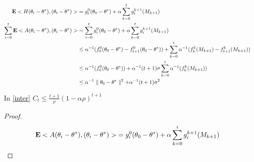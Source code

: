 \begin{align*}
\mathbf{E}<H(\theta_t-\theta^*),(\theta_t-\theta^*)>&=g^0_t(\theta_0-\theta^*)+\alpha\sum_{k=0}^t g^{k+1}_t(M_{k+1})\\
\sum_{i=0}^t\mathbf{E}<A(\theta_i-\theta^*),(\theta_i-\theta^*)>&=\sum_{i=0}^t g^0_i(\theta_0-\theta^*)+\alpha\sum_{k=0}^t g^{k+1}_i(M_{k+1})\\
&\leq\alpha^{-1}(f^0_0(\theta_0-\theta^*)-f^0_{t+1}(\theta_0-\theta^*))+\sum_{k=0}^t \alpha^{-1}(f^k_k(M_{k+1})-f^k_{t+1}(M_{k+1}))\\
&\leq\alpha^{-1}(f^0_0(\theta_0-\theta^*))+\alpha^{-1}(t+1)\sigma\sum_{k=0}^t \alpha^{-1}(f^k_k(M_{k+1}))\\
&\leq\alpha^{-1}\parallel \theta_0-\theta^*\parallel^2+\alpha^{-1}(t+1)\sigma^2
\end{align*}
\begin{lemma}
In \eqref{inter} $C_t\leq \frac{t+1}{\rho}{(1-\alpha\rho)^{t+1}}$
\end{lemma}
\begin{proof}
\begin{align*}
\mathbf{E}<A(\theta_i-\theta^*),(\theta_i-\theta^*)>&=g^0_i(\theta_0-\theta^*)+\alpha\sum_{k=0}^i g^{k+1}_i(M_{k+1})\\
\end{align*}
\end{proof}
